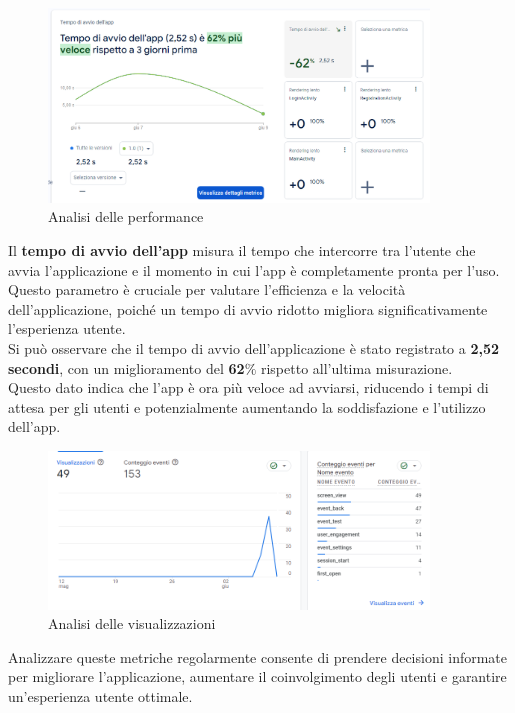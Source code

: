\documentclass{article}
\begin{document}
		\begin{center}
			\begin{figure}[H]
				\centering
				\includegraphics[width=0.9\textwidth]{Immagini/metricavvio}
				\caption{Analisi delle performance}
			\end{figure}
		\end{center}
		Il \textbf{tempo di avvio dell'app} misura il tempo che intercorre tra l'utente che avvia l'applicazione e il momento in cui l'app è completamente pronta per l'uso. Questo parametro è cruciale per valutare l'efficienza e la velocità dell'applicazione, poiché un tempo di avvio ridotto migliora significativamente l'esperienza utente.\\
		Si può osservare che il tempo di avvio dell'applicazione è stato registrato a \textbf{2,52 secondi}, con un miglioramento del \textbf{62$\%$} rispetto all'ultima misurazione.\\ Questo dato indica che l'app è ora più veloce ad avviarsi, riducendo i tempi di attesa per gli utenti e potenzialmente aumentando la soddisfazione e l'utilizzo dell'app.
		\begin{center}
			\begin{figure}[H]
				\centering
				\includegraphics[width=0.9\textwidth]{Immagini/analisivisualizzazioni}
				\caption{Analisi delle visualizzazioni}
			\end{figure}
		\end{center}
		Analizzare queste metriche regolarmente consente di prendere decisioni informate per migliorare l'applicazione, aumentare il coinvolgimento degli utenti e garantire un'esperienza utente ottimale.\\
\end{document}
